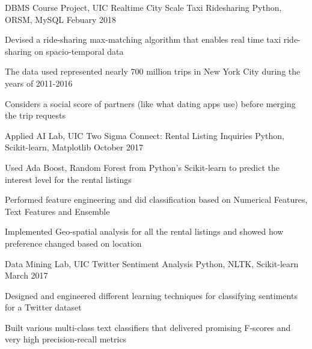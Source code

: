 \vspace{-2mm}
\begin{cventries}
  \cventry
    {DBMS Course Project, UIC}
    {Realtime City Scale Taxi Ridesharing\vspace{-2mm}}
    {Python, ORSM, MySQL\vspace{-2mm}}
    {Febuary 2018}
    {
      \begin{cvitems}
        \item {Devised a ride-sharing max-matching algorithm that enables real time taxi ride-sharing on spacio-temporal data}
        \item {The data used represented nearly 700 million trips in New York City during the years of 2011-2016}
        \item {Considers a social score of partners (like what dating apps use) before merging the trip requests\vspace{-2mm}}
      \end{cvitems}
    }
  \cventry
    {Applied AI Lab, UIC}
    {Two Sigma Connect: Rental Listing Inquiries\vspace{-2mm}}
    {Python, Scikit-learn, Matplotlib\vspace{-2mm}}
    {October 2017}
    {
      \begin{cvitems}
        \item {Used Ada Boost, Random Forest from Python’s Scikit-learn to predict the interest level for the rental listings}
        \item{Performed feature engineering and did classification based on Numerical Features, Text Features and Ensemble}
        \item{Implemented Geo-spatial analysis for all the rental listings and showed how preference changed based on location\vspace{-2mm}}
      \end{cvitems}
    }
  \cventry
    {Data Mining Lab, UIC}
    {Twitter Sentiment Analysis\vspace{-2mm}}
    {Python, NLTK, Scikit-learn\vspace{-2mm}}
    {March 2017}
    {
      \begin{cvitems}
        \item {Designed and engineered different learning techniques for classifying sentiments for a Twitter dataset}
        \item{Built various multi-class text classifiers that delivered promising F-scores and very high precision-recall metrics\vspace{-2mm}}

\end{cvitems}}
\end{cventries}
